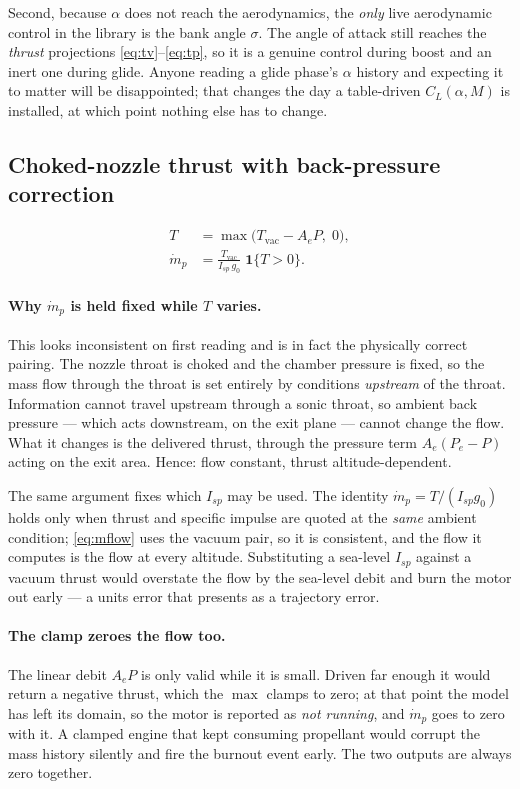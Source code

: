 \documentclass[11pt]{article}
\begin{document}
Second, because $\alpha$ does not reach the aerodynamics, the \emph{only} live
aerodynamic control in the library is the bank angle $\sigma$. The angle of
attack still reaches the \emph{thrust} projections \eqref{eq:tv}--\eqref{eq:tp},
so it is a genuine control during boost and an inert one during glide. Anyone
reading a glide phase's $\alpha$ history and expecting it to matter will be
disappointed; that changes the day a table-driven $C_L(\alpha,M)$ is installed,
at which point nothing else has to change.

\subsection{Choked-nozzle thrust with back-pressure correction}

\begin{align}
  T &= \max\bigl(T_{\text{vac}} - A_e P,\; 0\bigr) ,          \label{eq:thrust}\\
  \dot m_p &= \frac{T_{\text{vac}}}{I_{sp}\,g_0}\;\mathbf{1}\{T>0\} .
              \label{eq:mflow}
\end{align}

\paragraph{Why $\dot m_p$ is held fixed while $T$ varies.}
This looks inconsistent on first reading and is in fact the physically correct
pairing. The nozzle throat is choked and the chamber pressure is fixed, so the
mass flow through the throat is set entirely by conditions \emph{upstream} of
the throat. Information cannot travel upstream through a sonic throat, so
ambient back pressure --- which acts downstream, on the exit plane --- cannot
change the flow. What it changes is the delivered thrust, through the pressure
term $A_e(P_e - P)$ acting on the exit area. Hence: flow constant, thrust
altitude-dependent.

The same argument fixes which $I_{sp}$ may be used. The identity
$\dot m_p = T/(I_{sp}g_0)$ holds only when thrust and specific impulse are
quoted at the \emph{same} ambient condition; \eqref{eq:mflow} uses the vacuum
pair, so it is consistent, and the flow it computes is the flow at every
altitude. Substituting a sea-level $I_{sp}$ against a vacuum thrust would
overstate the flow by the sea-level debit and burn the motor out early --- a
units error that presents as a trajectory error.

\paragraph{The clamp zeroes the flow too.}
The linear debit $A_e P$ is only valid while it is small. Driven far enough it
would return a negative thrust, which the $\max$ clamps to zero; at that point
the model has left its domain, so the motor is reported as \emph{not running},
and $\dot m_p$ goes to zero with it. A clamped engine that kept consuming
propellant would corrupt the mass history silently and fire the burnout event
early. The two outputs are always zero together.
\end{document}
